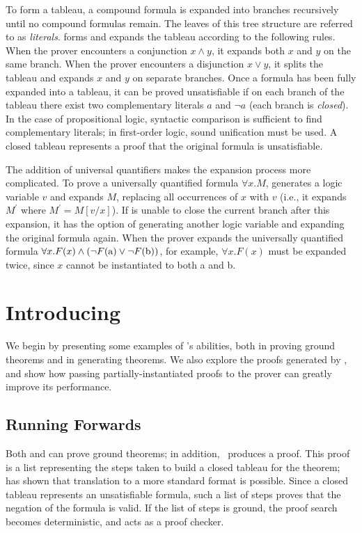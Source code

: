 To form a tableau, a compound formula is expanded into branches
recursively until no compound formulas remain.  The leaves of this
tree structure are referred to as \textit{literals}. \leantapsp forms
and expands the tableau according to the following rules. When the
prover encounters a conjunction $x \wedge y$, it expands both $x$ and
$y$ on the same branch. When the prover encounters a disjunction $x
\vee y$, it splits the tableau and expands $x$ and $y$ on separate
branches.  Once a formula has been fully expanded into a tableau, it
can be proved unsatisfiable if on each branch of the tableau there
exist two complementary literals $a$ and $\neg a$ (each branch is
\textit{closed}).  In the case of propositional logic, syntactic
comparison is sufficient to find complementary literals; in
first-order logic, sound unification must be used. A closed tableau
represents a proof that the original formula is unsatisfiable.

 The addition of universal quantifiers makes the expansion process more
 complicated. To prove a universally quantified formula \mbox{$\forall x. M$}, 
 \leantapsp generates a logic variable $v$ and expands $M$,
 replacing all occurrences of $x$ with $v$ (i.e., it expands $M^{\prime}$ where
 $M^{\prime} = M[v/x]$).  If \leantapsp is unable to close the current branch
 after this expansion, it has the option of generating another logic
 variable and expanding the original formula again. When the prover
 expands the universally quantified formula \mbox{$\forall x.  F(x) \wedge ( \neg F({\sf a})
   \vee \neg F({\sf b}) )$}, for example, \mbox{$\forall x.  F(x)$}
 must be expanded twice, since $x$ cannot be instantiated to both
 \textsf{a} and \textsf{b}.

\section{Introducing \alphatap}\label{alphatap}

We begin by presenting some examples of \alphatap's abilities, both in
proving ground theorems and in generating theorems. We also explore
the proofs generated by \alphatap, and show how passing
partially-instantiated proofs to the prover can greatly improve its
performance.

\subsection{Running Forwards}\label{forwards}

Both \leantapsp and \alphatapsp can prove ground theorems; in
addition, \alphatap\ produces a proof.  This proof is a list
representing the steps taken to build a closed tableau for the
theorem; \citet{paulson99generic} has shown that translation to
a more standard format is possible. Since a closed tableau represents
an unsatisfiable formula, such a list of steps proves that the
negation of the formula is valid. If the list of steps is ground, the
proof search becomes deterministic, and \alphatapsp acts as a proof
checker.

